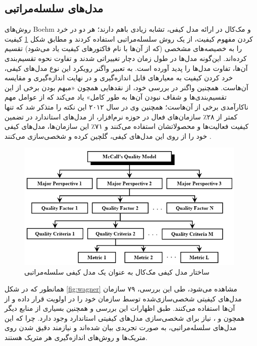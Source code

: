 \subsection{مدل‌های سلسله‌مراتبی}
روش‌های Boehm
\cite{boehm_quantitative_1976}
و مک‌کال
\cite{mccall_factors_1977}
در ارائه مدل کیفی، تشابه زیادی باهم دارند؛ هر دو در خرد کردن مفهوم کیفیت، از یک روش سلسله‌مراتبی استفاده کردند و مطابق شکل
\ref{fig:heir}
کیفیت را به خصیصه‌های مشخصی (که از آن‌ها با نام فاکتورهای کیفیت یاد می‌شود) تقسیم کرده‌اند. این‌گونه مدل‌ها در طول زمان دچار تغییراتی شدند و تفاوت نحوه تقسیم‌بندی آن‌ها، تفاوت مدل‌ها را پدید آورده است.
به تعبیر واگنر
\cite{wagner_software_2013}
رویکرد این نوع مدل‌های کیفی، خرد کردن کیفیت به معیارهای قابل اندازه‌گیری و در نهایت اندازه‌گیری و مقایسه آن‌هاست. همچنین واگنر در بررسی خود، از نقدهایی همچون «مبهم بودن برخی از این تقسیم‌بندی‌ها و شفاف نبودن آن‌ها به طور کامل» یاد می‌کند که از عوامل مهم ناکارآمدی برخی از آن‌هاست؛ همچنین وی در سال ۲۰۱۲ این نکته را متذکر شد که تنها کمتر از ۲۸٪ سازمان‌های فعال در حوزه نرم‌افزار، از مدل‌های استاندارد در تضمین کیفیت فعالیت‌ها و محصولاتشان استفاده می‌کنند و ۷۱٪ این سازمان‌ها، مدل‌های کیفی خود را از روی این مدل‌های کیفی، گلچین کرده و شخصی‌سازی می‌کنند
\cite{wagner_software_2012}.
\begin{figure}[H]
	\centering\includegraphics[width=11	cm]{Resources/heir.PNG}
	\caption{ساختار مدل کیفی مک‌کال به عنوان یک مدل کیفی سلسله‌مراتبی
		\cite{al-qutaish_quality_2010}
	}
	\label{fig:heir}
\end{figure}
همانطور که در شکل
\ref{fig:wagner}
مشاهده می‌شود، طی این بررسی، ۷۹ سازمان مدل‌های کیفیتی شخصی‌سازی‌شده توسط سازمان خود را در اولویت قرار داده و از آن‌ها استفاده می‌کنند. طبق اظهارات این بررسی و همچنین بسیاری از منابع دیگر همچون
\cite{pressman_software_2015} و
\cite{sommerville_software_2016}،
نیاز برای شخصی‌سازی مدل‌های کیفیتی استاندارد وجود دارد. چرا که این مدل‌های سلسله‌مراتبی، به صورت تجریدی بیان شده‌اند و نیازمند دقیق شدن روی متریک‌ها و روش‌های اندازه‌گیری هر متریک هستند.
